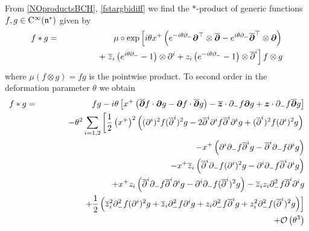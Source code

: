 From \eqref{NOproductsBCH}, \eqref{fstargbidiff} we find the $*$-product of
generic functions $f,g\in{\rm C}^{\infty}({\mathfrak n}^*)$ given by
\begin{eqnarray}
  \label{TOstargen}
  f*g&=&\mu\circ\exp\left[ i\theta x^+ \left( e^{- i\theta \partial_-} 
      {{\boldsymbol {\partial} }}^\top\otimes\overline{{{\boldsymbol {\partial} }}}- e^{ i\theta \partial_-} 
      {\overline{{{\boldsymbol {\partial} }}}}^{ \top}\otimes{{\boldsymbol {\partial} }}\right)\right.\\\nonumber
  &&\qquad\qquad+\left.\overline{z}_i 
    \left( e^{ i\theta \partial_-}-1\right)\otimes
    \partial^i+z_i \left( e^{- i\theta \partial_-}-1\right)
    \otimes\overline{\partial}^{ i}\right]f\otimes g
\end{eqnarray}
where $\mu(f\otimes g)=f g$ is the pointwise product. To second order
in the deformation parameter $\theta$ we obtain
\begin{eqnarray}
  \label{eq:time:positionspace}
  f\ast g&=&f g
  - i\theta \left[
    x^+ \left( \overline{{{\boldsymbol {\partial} }}}f\cdot{{\boldsymbol {\partial} }} g
    -{{\boldsymbol {\partial} }} f\cdot\overline{{{\boldsymbol {\partial} }}}g\right)
    -\overline{{{\boldsymbol {z} }}}\cdot\partial_-f {{\boldsymbol {\partial} }} g
    +{{\boldsymbol {z} }}\cdot\partial_-f \overline{{{\boldsymbol {\partial} }}}g
  \right]\\\nonumber
  &&- \theta^2 \sum\limits_{i=1,2} \left[ 
  \frac12 \left(x^+\right)^2 \left((\partial^i)^2f 
  ( {\overline{\partial}}^{ i})^2g
  -2{\overline{\partial}}^{ i}\partial^if {\overline{\partial}}^{ i}\partial^ig
  +({\overline{\partial}}^{ i})^2f (\partial^i)^2g\right)\right.
  \\\nonumber&&\qquad\qquad\quad- x^+ \left(\partial^i\partial_- f 
  {\overline{\partial}}^{ i}g
  -{\overline{\partial}}^{ i}\partial_- f \partial^ig\right)\\\nonumber
&&\qquad\qquad\quad
-x^+ \overline{z}_i \left( {\overline{\partial}}^{ i}\partial_- f (\partial^i)^2g
  -\partial^i\partial_- f {\overline{\partial}}^{ i}\partial^ig\right)\\
  \nonumber &&\qquad\qquad\quad
  + x^+ z_i \left( {\overline{\partial}}^{ i}\partial_-
    f {\overline{\partial}}^{ i}\partial^ig
  -\partial^i\partial_- f ( {\overline{\partial}}^{ i})^2g\right)
  -\overline{z}_i z_i \partial_-^2f {\overline{\partial}}^{ i}\partial^ig
  \\ \nonumber &&\qquad\qquad\quad
  +\Bigl.\frac12 \left(\overline{z}_i^{ 2} \partial_-^2f (\partial^i)^2g
  +\overline{z}_i \partial_-^2f \partial^ig
  +z_i \partial_-^2f {\overline{\partial}}^{ i}g
  +z_i^2 \partial_-^2f ( {\overline{\partial}}^{ i})^2g\right)
\Bigr]\\\nonumber
&& + \mathcal{O}\left(\theta^3\right)
\end{eqnarray}

